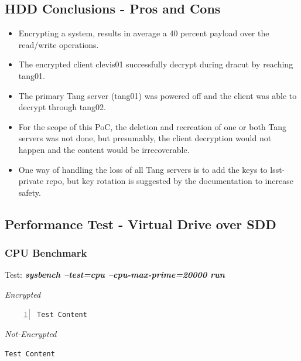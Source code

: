 \newpage
\subsection{HDD Conclusions - Pros and Cons}
\begin{itemize}
  \item Encrypting a system, results in average a 40 percent payload over the read/write operations.
  \item The encrypted client clevis01 successfully decrypt during dracut by reaching tang01.
  \item The primary Tang server (tang01) was powered off and the client was able to decrypt through tang02.
  \item For the scope of this PoC, the deletion and recreation of one or both Tang servers was not done, but presumably, the client decryption would not happen and the content would be irrecoverable.
  \item One way of handling the loss of all Tang servers is to add the keys to lsst-private repo, but key rotation is suggested by the documentation to increase safety.
\end{itemize}

\newpage
\subsection{Performance Test - Virtual Drive over SDD}
\subsubsection{CPU Benchmark}
\begin{center}
  Test: \textbf{\textit{sysbench --test=cpu --cpu-max-prime=20000 run}}  
\end{center}
\vspace*{-\baselineskip}
\noindent\begin{minipage}[t]{0.45\linewidth}
  \centering
  \textit{Encrypted}
  \lstset{language=bash,label=SliceExaple}
  \begin{lstlisting}[basicstyle=\tiny,frame=single, numbers=left, label=cpu_test1]
  Test Content      
  \end{lstlisting}
\end{minipage}
\hspace{0.5cm}
\noindent\begin{minipage}[t]{0.45\linewidth}
  \centering
  \textit{Not-Encrypted}
  \begin{lstlisting}[basicstyle=\tiny,frame=single, label=cpu_test2]
  Test Content
  \end{lstlisting}
\end{minipage}

